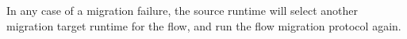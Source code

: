 In any case of a migration failure, the source runtime will select another migration target runtime for the flow, and run the flow migration protocol again.









